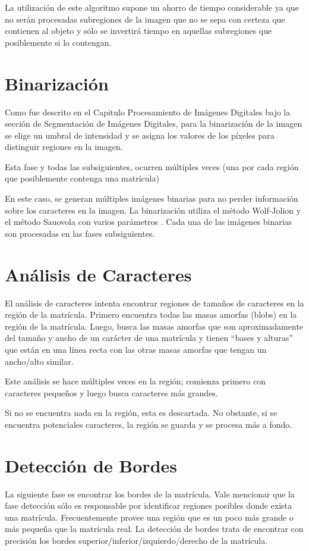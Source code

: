 La utilización de este algoritmo supone un ahorro de tiempo considerable ya que no serán procesadas subregiones de la imagen que no se sepa con certeza que contienen al objeto y sólo se invertirá tiempo en aquellas subregiones que posiblemente si lo contengan. \cite{Viola2001-rh}

\section{Binarización}
Como fue descrito en el Capitulo Procesamiento de Imágenes Digitales bajo la sección de Segmentación de Imágenes Digitales, para la binarización de la imagen se elige un umbral de intensidad y se asigna los valores de los píxeles para distinguir regiones en la imagen.

Esta fase y todas las subsiguientes, ocurren múltiples veces (una por cada región que posiblemente contenga una matrícula)

En este caso, se generan múltiples imágenes binarias para no perder información sobre los caracteres en la imagen. La binarización utiliza el método Wolf-Jolion y el método Sauovola con varios parámetros \cite{Wolf2004-so,Oliveira2009-io}. Cada una de las imágenes binarias son procesadas en las fases subsiguientes.
\section{Análisis de Caracteres}
El análisis de caracteres intenta encontrar regiones de tamaños de caracteres en la región de la matrícula. Primero encuentra todas las masas amorfas (blobs) en la región de la matrícula. Luego, busca las masas amorfas que son aproximadamente del tamaño y ancho de un carácter de una matrícula y tienen “bases y alturas” que están en una línea recta con las otras masas amorfas que tengan un ancho/alto similar.

Este análisis se hace múltiples veces en la región; comienza primero con caracteres pequeños y luego busca caracteres más grandes.

Si no se encuentra nada en la región, esta es descartada. No obstante, si se encuentra potenciales caracteres, la región se guarda y se procesa más a fondo.
\section{Detección de Bordes}
La siguiente fase es encontrar los bordes de la matrícula. Vale mencionar que la fase detección sólo es responsable por identificar regiones posibles donde exista una matrícula. Frecuentemente provee una región que es un poco más grande o más pequeña que la matrícula real. La detección de bordes trata de encontrar con precisión los bordes superior/inferior/izquierdo/derecho de la matrícula.

